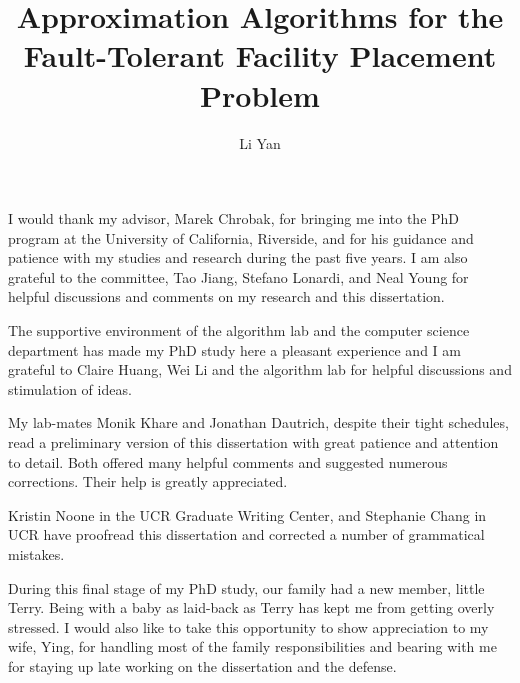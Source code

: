 \documentclass[oneside,final]{ucr}
\begin{document}

\title{Approximation Algorithms for the Fault-Tolerant Facility Placement Problem}
\author{Li Yan}

\maketitle
\copyrightpage{}
\approvalpage{}


\begin{frontmatter}

\begin{acknowledgements}
  I would thank my advisor, Marek Chrobak, for bringing me
  into the PhD program at the University of California,
  Riverside, and for his guidance and patience with my studies
  and research during the past five years. I am also
  grateful to the committee, Tao Jiang, Stefano Lonardi, and
  Neal Young for helpful discussions and comments on my
  research and this dissertation.

  The supportive environment of the algorithm lab and the
  computer science department has made my PhD study here a
  pleasant experience and I am grateful to Claire Huang, Wei
  Li and the algorithm lab for helpful discussions and
  stimulation of ideas.

  My lab-mates Monik Khare and Jonathan Dautrich, despite their tight
  schedules, read a preliminary version of this dissertation
  with great patience and attention to detail. Both offered
  many helpful comments and suggested numerous
  corrections. Their help is greatly appreciated.

  Kristin Noone in the UCR Graduate Writing Center, and
  Stephanie Chang in UCR have proofread this dissertation
  and corrected a number of grammatical mistakes.

  During this final stage of my PhD study, our family had a
  new member, little Terry. Being with a baby as laid-back
  as Terry has kept me from getting overly stressed. I would
  also like to take this opportunity to show appreciation to
  my wife, Ying, for handling most of the family
  responsibilities and bearing with me for staying up late
  working on the dissertation and the defense.
\end{acknowledgements}


\end{frontmatter}
\end{document}
